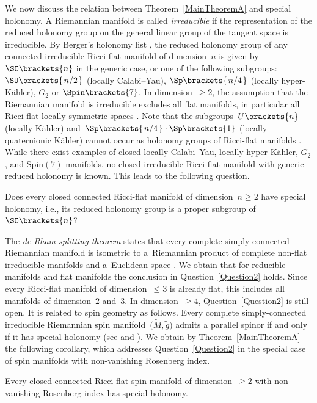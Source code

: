 \documentclass[10pt,a4paper]{amsart}
\numberwithin{equation}{section}
\newcommand{\slfrac}[2]{\left.#1\middle/#2\right.}
\begin{document}
We now discuss the relation between Theorem~\ref{MainTheoremA} and special holonomy. A Riemannian manifold is called \textit{irreducible} if the representation of the reduced holonomy group on the general
linear group of the tangent space is irreducible. By Berger's holonomy list \cite{Berger1955}, the reduced holonomy group of any connected irreducible Ricci-flat manifold of dimension~$n$ is given by~$\SO\brackets{n}$ in the generic case, or one of the following subgroups:
$\SU\brackets{\slfrac{n}{2}}$ (locally Calabi--Yau), $\Sp\brackets{\slfrac{n}{4}}$ (locally hyper-K\"ahler), $ G_2 $ or $ \Spin\brackets{7}$. In dimension~$\geq 2$, the assumption that the Riemannian manifold is irreducible excludes all flat manifolds, in particular all Ricci-flat locally symmetric spaces \cite[Theorems 10.72 and 7.61]{Besse1987}. Note that the subgroups~$U\brackets{n}$ (locally K\"ahler) and~$\Sp\brackets{\slfrac{n}{4}}\cdot\Sp\brackets{1}$ (locally quaternionic K\"ahler) cannot occur as holonomy groups of Ricci-flat manifolds \cite[Proposition~10.29 and Theorem~14.45]{Besse1987}. While there exist examples of closed locally Calabi–Yau, locally hyper-K\"ahler, $G_2$, and $\mathrm{Spin}(7)$ manifolds, no closed irreducible Ricci-flat manifold with generic reduced holonomy is known. This leads to the following question.
%
\begin{que} \label{Question2}
 Does every closed connected Ricci-flat manifold of dimension~$n \geq 2$ have special holonomy, i.e., its reduced holonomy group is a proper subgroup of~$\SO\brackets{n}$?
\end{que}
%
The \textit{de Rham splitting theorem} states that every complete simply-connected Riemannian manifold is isometric to a~Riemannian product of complete non-flat irreducible manifolds and a~Euclidean space \cite[Theorem~10.43]{Besse1987}. We obtain that for reducible manifolds and flat manifolds the conclusion in Question~\ref{Question2} holds. Since every Ricci-flat manifold of dimension~$\leq 3$ is already flat, this includes all manifolds of dimension~$2$ and~$3$. In dimension~$\geq 4$, Question~\ref{Question2} is still open. It is related to spin geometry as follows. Every complete simply-connected irreducible Riemannian spin manifold~$\bigl(\tilde{M},\tilde{g}\bigr)$ admits a parallel spinor if and only if it has special holonomy (see \cite[Theorem~1.2]{Hitchin1974} and \cite{Wang1989}). We obtain by Theorem~\ref{MainTheoremA} the following corollary, which addresses Question~\ref{Question2} in the special case of spin manifolds with non-vanishing Rosenberg index.
%
\begin{cor} \label{CorollayB}
 Every closed connected Ricci-flat spin manifold of dimension~$\geq 2$ with non-vanishing Rosenberg index has special holonomy.
\end{cor}
%
\end{document}
